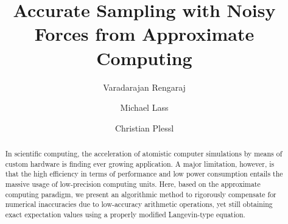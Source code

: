 \documentclass[format=acmsmall,review,timestamp,urlbreakonhyphens]{acmart}
\begin{document}



\keywords{}




\begin{abstract}
In scientific computing, the acceleration of atomistic computer simulations by means of custom hardware is finding ever growing application.
A major limitation, however, is that the high efficiency in terms of performance and low power consumption entails the massive usage of low-precision computing units. Here, based on the approximate computing paradigm, we present an algorithmic method to rigorously compensate for numerical inaccuracies due to low-accuracy arithmetic operations, yet still obtaining exact expectation values using a properly modified Langevin-type equation. %
\end{abstract}



\title{Accurate Sampling with Noisy Forces from Approximate Computing}

\author{Varadarajan Rengaraj}

\author{Michael Lass}

\author{Christian Plessl}
\end{document}
